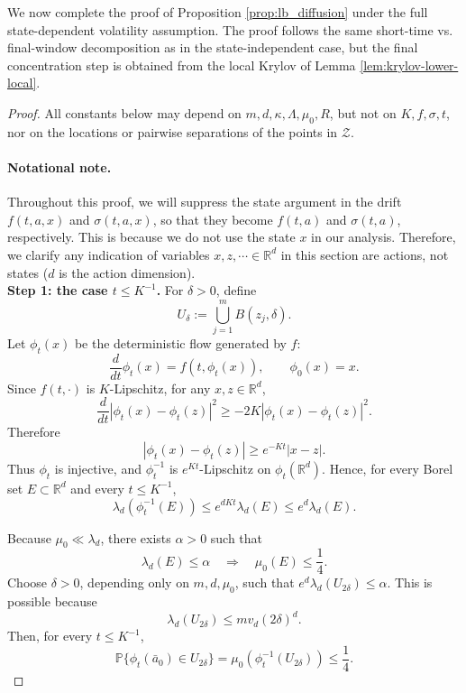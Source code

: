 \documentclass{article}
\newcommand{\1}{\mathbbm{1}}
\numberwithin{equation}{section}
\begin{document}
We now complete the proof of Proposition \ref{prop:lb_diffusion} under the full state-dependent volatility assumption. The proof follows the same short-time vs. final-window decomposition as in the state-independent case, but the final concentration step is obtained from the local Krylov of Lemma \ref{lem:krylov-lower-local}.

\begin{proof}
All constants below may depend on $m,d,\kappa,\Lambda,\mu_0,R$, but not on
$K,f,\sigma,t$, nor on the locations or pairwise separations of the points
in $\mathcal{Z}$.
\paragraph{Notational note.} Throughout this proof, we will suppress the state argument in the drift $f(t, a, x)$ and $\sigma(t, a, x)$, so that they become $f(t, a)$ and $\sigma(t, a)$, respectively. This is because we do not use the state $x$ in our analysis. Therefore, we clarify any indication of variables $x, z,\cdots \in \mathbb{R}^{d}$ in this section are actions, not states ($d$ is the action dimension).\\

\textbf{Step 1: the case $t\le K^{-1}$.}
For $\delta>0$, define
$$
U_\delta:=\bigcup_{j=1}^m B(z_j,\delta).
$$
Let $\phi_t(x)$ be the deterministic flow generated by $f$:
$$
\frac{d}{dt}\phi_t(x)=f(t,\phi_t(x)),
\qquad
\phi_0(x)=x.
$$
Since $f(t,\cdot)$ is $K$-Lipschitz, for any $x,z\in\mathbb R^d$,
$$
\frac{d}{dt}|\phi_t(x)-\phi_t(z)|^2
\ge
-2K|\phi_t(x)-\phi_t(z)|^2.
$$
Therefore
$$
|\phi_t(x)-\phi_t(z)|\ge e^{-Kt}|x-z|.
$$
Thus $\phi_t$ is injective, and $\phi_t^{-1}$ is $e^{Kt}$-Lipschitz on
$\phi_t(\mathbb R^d)$. Hence, for every Borel set $E\subset\mathbb R^d$
and every $t\le K^{-1}$,
$$
\lambda_d(\phi_t^{-1}(E))
\le
e^{dKt}\lambda_d(E)
\le
e^d\lambda_d(E).
$$

Because $\mu_0\ll\lambda_d$, there exists $\alpha>0$ such that
$$
\lambda_d(E)\le \alpha
\quad\Longrightarrow\quad
\mu_0(E)\le \frac14.
$$
Choose $\delta>0$, depending only on $m,d,\mu_0$, such that
$
e^d\lambda_d(U_{2\delta})\le \alpha .
$
This is possible because
$$
\lambda_d(U_{2\delta})
\le
m v_d(2\delta)^d .
$$
Then, for every $t\le K^{-1}$,
$$
\mathbb P\{\phi_t(\bar a_0)\in U_{2\delta}\}
=
\mu_0(\phi_t^{-1}(U_{2\delta}))
\le
\frac14.
$$


\end{proof}
\end{document}
